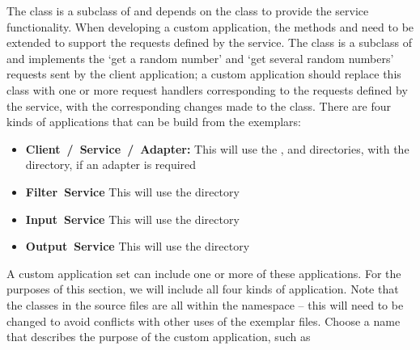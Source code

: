 The  class is a subclass of
 and depends on the
 class to provide the service functionality.
When developing a custom application, the methods  and
 need to be extended to support the requests defined by the
service.
The  class is a subclass of
 and implements the `get a random number' and
`get several random numbers' requests sent by the 
client application; a custom application should replace this class with one or more
request handlers corresponding to the requests defined by the service, with the
corresponding changes made to the  class.
\secondaryEnd{}
There are four kinds of applications that can be build from the exemplars:
\begin{itemize}
\item \textbf{Client~/~Service~/~Adapter:} This will use the
,  and
 directories, with the 
directory, if an adapter is required
\item \textbf{Filter~Service} This will use the 
directory
\item \textbf{Input~Service} This will use the 
directory
\item \textbf{Output~Service} This will use the 
directory 
\end{itemize}
A custom application set can include one or more of these applications.
For the purposes of this section, we will include all four kinds of application.
\tertiaryEnd{}
Note that the classes in the source files are all within the 
namespace -- this will need to be changed to avoid conflicts with other uses of the
exemplar files.
Choose a name that describes the purpose of the custom application, such as
